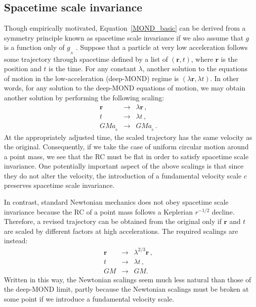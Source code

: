 \documentclass[fleqn,usenatbib,useAMS,onecolumn]{mnras} %
\begin{document}
\subsection{Spacetime scale invariance}
\label{Spacetime_scale_invariance}

Though empirically motivated, Equation~\ref{MOND_basic} can be derived from a symmetry principle known as spacetime scale invariance if we also assume that $g$ is a function only of $g_{_N}$ \citep{Milgrom_2009_DML}. Suppose that a particle at very low acceleration follows some trajectory through spacetime defined by a list of $\left( \bm{r}, t \right)$, where $\bm{r}$ is the position and $t$ is the time. For any constant $\lambda$, another solution to the equations of motion in the low-acceleration (deep-MOND) regime is $ \left( \lambda \bm{r}, \lambda t \right)$. In other words, for any solution to the deep-MOND equations of motion, we may obtain another solution by performing the following scaling:
\begin{eqnarray}
	\bm{r} &\to& \lambda \bm{r} \, , \\
	t &\to& \lambda t \, , \\
	GMa_{_0} &\to& GMa_{_0} \, .
	\label{Scale_invariance_scalings}
\end{eqnarray}
At the appropriately adjusted time, the scaled trajectory has the same velocity as the original. Consequently, if we take the case of uniform circular motion around a point mass, we see that the RC must be flat in order to satisfy spacetime scale invariance. One potentially important aspect of the above scalings is that since they do not alter the velocity, the introduction of a fundamental velocity scale $c$ preserves spacetime scale invariance.

In contrast, standard Newtonian mechanics does not obey spacetime scale invariance because the RC of a point mass follows a Keplerian $r^{-1/2}$ decline. Therefore, a revised trajectory can be obtained from the original only if $\bm{r}$ and $t$ are scaled by different factors at high accelerations. The required scalings are instead:
\begin{eqnarray}
	\bm{r} &\to& \lambda^{2/3} \bm{r} \, , \\
	t &\to& \lambda t \, , \\
	GM &\to& GM.
	\label{Newtonian_scalings}
\end{eqnarray}
Written in this way, the Newtonian scalings seem much less natural than those of the deep-MOND limit, partly because the Newtonian scalings must be broken at some point if we introduce a fundamental velocity scale.
\end{document}

